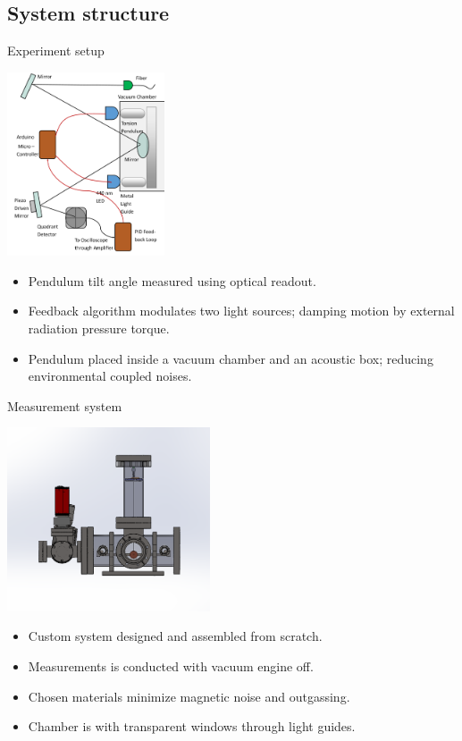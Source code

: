 \documentclass{beamer}
\begin{document}
\subsection{System structure}

\begin{frame}{Experiment setup}
	\begin{center}		
			\includegraphics[width=0.35\textwidth,keepaspectratio]{setup cropped.png}
	\end{center}
	\begin{itemize}
		\item Pendulum tilt angle measured using optical readout.
		\item Feedback algorithm modulates two light sources; damping motion by external radiation pressure torque.
		\item Pendulum placed inside a vacuum chamber and an acoustic box; reducing environmental coupled noises.

	\end{itemize}
	
\end{frame}

\begin{frame}{Measurement system}
	\begin{center}		
		\includegraphics[width=0.45\textwidth,keepaspectratio]{total_chamber.png}
	\end{center}
	\begin{itemize}
		\item Custom system designed and assembled from scratch.
		\item Measurements is conducted with vacuum engine off.
		\item Chosen materials minimize magnetic noise and outgassing.
		\item Chamber is with transparent windows through light guides.


		
	\end{itemize}	
\end{frame}
\end{document}
